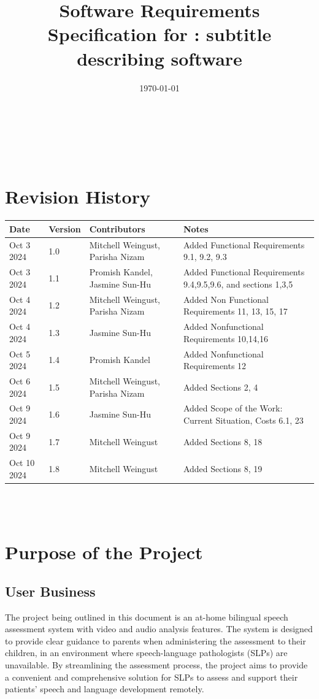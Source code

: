 \documentclass[12pt]{article}
\begin{document}
\title{Software Requirements Specification for \progname: subtitle describing software} 
\author{\authname}
\date{\today}
	
\maketitle

~\newpage


\tableofcontents

~\newpage

\section*{Revision History}

\begin{tabularx}{\textwidth}{p{2cm}p{1.5cm}p{3.5cm}X}
\toprule {\textbf{Date}} & {\textbf{Version}} & {\textbf{Contributors}} & {\textbf{Notes}}\\
\midrule
Oct 3 2024 & 1.0 & Mitchell Weingust, Parisha Nizam & Added Functional Requirements 9.1, 9.2, 9.3 \\
Oct 3 2024 & 1.1 & Promish Kandel, Jasmine Sun-Hu & Added Functional Requirements 9.4,9.5,9.6, and sections 1,3,5\\
Oct 4 2024 & 1.2 & Mitchell Weingust, Parisha Nizam & Added Non Functional Requirements 11, 13, 15, 17\\
Oct 4 2024 & 1.3 & Jasmine Sun-Hu & Added Nonfunctional Requirements 10,14,16\\
Oct 5 2024 & 1.4 & Promish Kandel & Added Nonfunctional Requirements 12\\
Oct 6 2024 & 1.5 & Mitchell Weingust, Parisha Nizam & Added Sections 2, 4\\
Oct 9 2024 & 1.6 & Jasmine Sun-Hu & Added Scope of the Work: Current Situation, Costs 6.1, 23\\
Oct 9 2024 & 1.7 & Mitchell Weingust & Added Sections 8, 18\\
Oct 10 2024 & 1.8 & Mitchell Weingust & Added Sections 8, 19\\
\bottomrule
\end{tabularx}

~\\

~\newpage
\section{Purpose of the Project}
\subsection{User Business}
\hspace{1.5em}The project being outlined in this document is an at-home bilingual speech 
assessment system with video and audio analysis features. The system is designed 
to provide clear guidance to parents when administering the assessment to their 
children, in an environment where speech-language pathologists (SLPs) are 
unavailable. By streamlining the assessment process, the project aims to provide a 
convenient and comprehensive solution for SLPs to assess and support their patients'
speech and language development remotely. 
\end{document}

